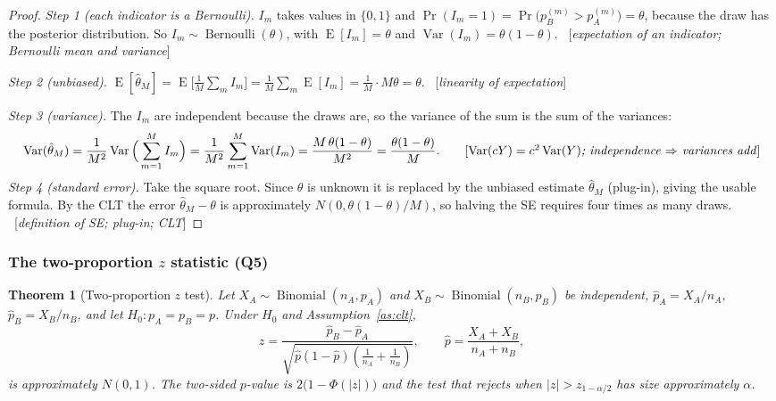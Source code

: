 \documentclass[11pt]{article}
\newtheorem{theorem}{Theorem}
\theoremstyle{definition}
\theoremstyle{remark}
\renewcommand{\Pr}{\operatorname{Pr}}
\newcommand{\E}{\operatorname{E}}
\newcommand{\Var}{\operatorname{Var}}
\newcommand{\Bin}{\operatorname{Binomial}}
\newcommand{\Ber}{\operatorname{Bernoulli}}
\newcommand{\rulename}[1]{\ {[\emph{#1}]}}
\begin{document}
\begin{proof}
\emph{Step 1 (each indicator is a Bernoulli).}
$I_m$ takes values in $\{0,1\}$ and $\Pr(I_m=1)=\Pr\big(p_B^{(m)}>p_A^{(m)}\big)=\theta$, because the draw
has the posterior distribution. So $I_m\sim\Ber(\theta)$, with $\E[I_m]=\theta$ and $\Var(I_m)=\theta(1-\theta)$.
\rulename{expectation of an indicator; Bernoulli mean and variance}

\emph{Step 2 (unbiased).}
$\E[\hat\theta_M]=\E\big[\frac1M\sum_m I_m\big]=\frac1M\sum_m\E[I_m]=\frac1M\cdot M\theta=\theta$.
\rulename{linearity of expectation}

\emph{Step 3 (variance).}
The $I_m$ are independent because the draws are, so the variance of the sum is the sum of the variances:
\[
\Var(\hat\theta_M)=\frac1{M^2}\Var\Big(\sum_{m=1}^M I_m\Big)=\frac1{M^2}\sum_{m=1}^M\Var(I_m)
=\frac{M\,\theta(1-\theta)}{M^2}=\frac{\theta(1-\theta)}{M}.
\tag*{[\emph{$\Var(cY)=c^2\Var(Y)$; independence $\Rightarrow$ variances add}]}
\]
\emph{Step 4 (standard error).} Take the square root. Since $\theta$ is unknown it is replaced by the
unbiased estimate $\hat\theta_M$ (plug-in), giving the usable formula. By the CLT the error
$\hat\theta_M-\theta$ is approximately $N(0,\theta(1-\theta)/M)$, so halving the SE requires four times as many draws.
\rulename{definition of SE; plug-in; CLT}
\end{proof}

\subsubsection[The two-proportion \texorpdfstring{$z$}{z} statistic (Q5)]{The two-proportion $z$ statistic (Q5)}

\begin{theorem}[Two-proportion $z$ test]\label{thm:z}
Let $X_A\sim\Bin(n_A,p_A)$ and $X_B\sim\Bin(n_B,p_B)$ be independent, $\hat p_A=X_A/n_A$, $\hat p_B=X_B/n_B$,
and let $H_0:p_A=p_B=p$. Under $H_0$ and Assumption~\ref{as:clt},
\[
z=\frac{\hat p_B-\hat p_A}{\sqrt{\hat p(1-\hat p)\left(\frac1{n_A}+\frac1{n_B}\right)}},
\qquad \hat p=\frac{X_A+X_B}{n_A+n_B},
\]
is approximately $N(0,1)$. The two-sided $p$-value is $2\big(1-\Phi(|z|)\big)$ and the test that rejects
when $|z|>z_{1-\alpha/2}$ has size approximately $\alpha$.
\end{theorem}
\end{document}

